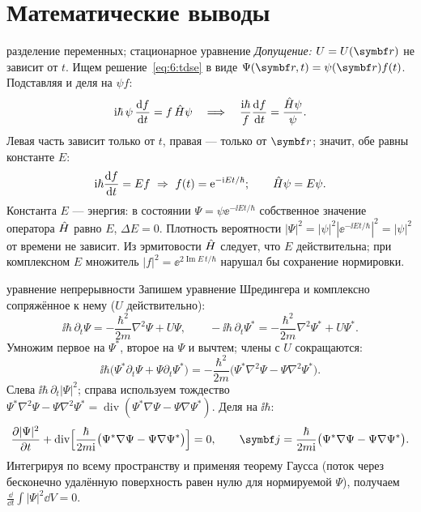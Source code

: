 \section{Математические выводы}

\begin{derivation}[label=der:6:sep]{разделение переменных; стационарное уравнение}
\emph{Допущение:} $U=U(\vect r)$ не зависит от $t$. Ищем решение~\eqref{eq:6:tdse} в виде
$\Psi(\vect r,t)=\psi(\vect r)f(t)$. Подставляя и деля на $\psi f$:
\[
  \mathrm{i}\hbar\,\psi\,\frac{\mathrm{d} f}{\mathrm{d} t}=f\,\hat{H}\psi
  \quad\Longrightarrow\quad
  \frac{\mathrm{i}\hbar}{f}\frac{\mathrm{d} f}{\mathrm{d} t}=\frac{\hat{H}\psi}{\psi}.
\]
Левая часть зависит только от $t$, правая — только от $\vect r$; значит, обе равны константе $E$:
\[
  \ii\hbar\diff{f}{t}=Ef\ \Rightarrow\ f(t)=\ee^{-\ii Et/\hbar};\qquad \op H\psi=E\psi .
\]
Константа $E$ — энергия: в состоянии $\Psi=\psi\ee^{-\ii Et/\hbar}$ собственное значение оператора
$\hat{H}$ равно $E$, $\Delta E=0$. Плотность вероятности $|\Psi|^2=|\psi|^2|\ee^{-\ii Et/\hbar}|^2=|\psi|^2$
от времени не зависит. Из эрмитовости $\hat{H}$ следует, что $E$ действительна; при комплексном $E$
множитель $|f|^2=\ee^{2\operatorname{Im}E\,t/\hbar}$ нарушал бы сохранение нормировки.
\end{derivation}

\begin{derivation}[label=der:6:cont]{уравнение непрерывности}
Запишем уравнение Шредингера и комплексно сопряжённое к нему ($U$ действительно):
\[
  \ii\hbar\,\partial_t\Psi=-\frac{\hbar^2}{2m}\nabla^2\Psi+U\Psi,\qquad
  -\ii\hbar\,\partial_t\Psi^*=-\frac{\hbar^2}{2m}\nabla^2\Psi^*+U\Psi^* .
\]
Умножим первое на $\Psi^*$, второе на $\Psi$ и вычтем; члены с $U$ сокращаются:
\[
  \ii\hbar\bigl(\Psi^*\partial_t\Psi+\Psi\partial_t\Psi^*\bigr)
  =-\frac{\hbar^2}{2m}\bigl(\Psi^*\nabla^2\Psi-\Psi\nabla^2\Psi^*\bigr).
\]
Слева $\ii\hbar\,\partial_t|\Psi|^2$; справа используем тождество
$\Psi^*\nabla^2\Psi-\Psi\nabla^2\Psi^*=\operatorname{div}(\Psi^*\nabla\Psi-\Psi\nabla\Psi^*)$. Деля на $\ii\hbar$:
\[
  \pdiff{|\Psi|^2}{t}+\operatorname{div}\Bigl[\frac{\hbar}{2m\ii}\bigl(\Psi^*\nabla\Psi-\Psi\nabla\Psi^*\bigr)\Bigr]=0,
  \qquad \vect j=\frac{\hbar}{2m\ii}\bigl(\Psi^*\nabla\Psi-\Psi\nabla\Psi^*\bigr).
\]
Интегрируя по всему пространству и применяя теорему Гаусса (поток через бесконечно удалённую
поверхность равен нулю для нормируемой $\Psi$), получаем $\frac{\dd}{\dd t}\int|\Psi|^2\dd V=0$.
\end{derivation}

